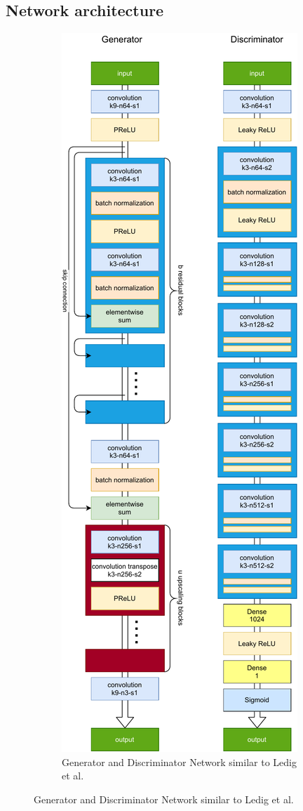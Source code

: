\documentclass[11pt,twocolumn,twoside,paper=a4]{IEEEtran}
\begin{document}
\subsection{Network architecture}
\begin{figure}[h] 
    \centering
    \begin{subfigure}{0.9\textwidth}
        \centering
        \includegraphics[scale=0.7]{../images/gen_and_dis.pdf}  
        \caption{Generator and Discriminator Network similar to Ledig et al.~\cite{DBLP:journals/corr/LedigTHCATTWS16} }
        \label{fig:generator}
    \end{subfigure}
    \centering
    
    \label{fig:memory_plot}
\end{figure}
\end{document}
